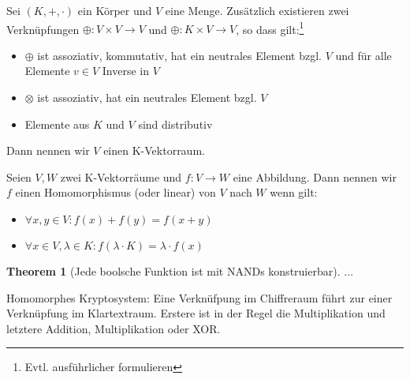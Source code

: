 \begin{theorem}[K-Vektorraum]
	Sei $(K,+,\cdot)$ ein Körper und $V$ eine Menge. Zusätzlich existieren zwei Verknüpfungen $\oplus: V\times V \rightarrow V$ und $\oplus: K\times V \rightarrow V$, so dass gilt:\footnote{Evtl. ausführlicher formulieren}
	\begin{itemize}
		\item $\oplus$ ist assoziativ, kommutativ, hat ein neutrales Element bzgl. $V$ und für alle Elemente $v\in V$ Inverse in $V$
		\item $\otimes$ ist assoziativ, hat ein neutrales Element bzgl. $V$
		\item Elemente aus $K$ und $V$ sind distributiv
	\end{itemize}
	Dann nennen wir $V$ einen K-Vektorraum.
\end{theorem}

\begin{theorem}[Homomorphismus]
	Seien $V,W$ zwei K-Vektorräume und $f:V\rightarrow W$ eine Abbildung. Dann nennen wir $f$ einen Homomorphismus (oder linear) von $V$ nach $W$ wenn gilt:
	\begin{itemize}
		\item $\forall x,y\in V : f(x)+f(y) = f(x+y)$
		\item $\forall x\in V, \lambda\in K: f(\lambda\cdot K)=\lambda\cdot f(x)$
	\end{itemize}
\end{theorem}

\newtheorem{theorem2}{Theorem}[section]
\begin{theorem2}[Jede boolsche Funktion ist mit NANDs konstruierbar]
	$\ldots$
\end{theorem2}

Homomorphes Kryptosystem:
Eine Verknüfpung im Chiffreraum führt zur einer Verknüpfung im Klartextraum. Erstere ist in der Regel die Multiplikation und letztere Addition, Multiplikation oder XOR.